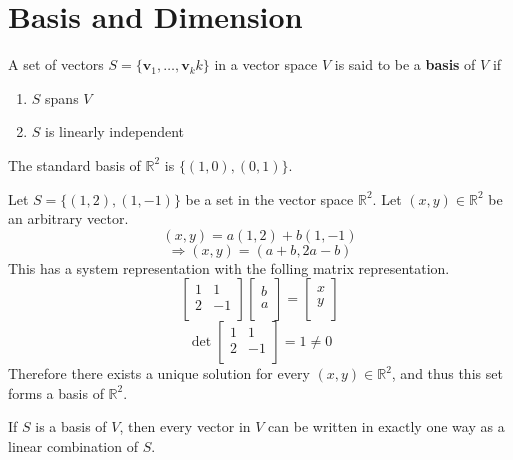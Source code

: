 \section{Basis and Dimension}
\begin{definition}[Basis]
    A set of vectors \(S=\{ \mathbf{v} _1,\ldots,\mathbf{v} _kk \} \) in a vector space \(V\) is said to be a \textbf{basis} of \(V\) if 
    \begin{enumerate}
        \item \(S\) spans \(V\) 
        \item \(S\) is linearly independent
    \end{enumerate}
\end{definition}
\begin{eg}
    The standard basis of \(\mathbb{R} ^2\) is \(\{ (1,0),(0,1) \} \).
\end{eg}
\begin{eg}
    Let \(S=\{ (1,2),(1,-1) \} \) be a set in the vector space \(\mathbb{R} ^2\). Let \((x,y)\in\mathbb{R} ^2\) be an arbitrary vector.
    \[
        (x,y)=a(1,2)+b(1,-1)
    \]
    \[
        \Longrightarrow (x,y)=(a+b,2a-b)
    \]
    This has a system representation with the folling matrix representation.
    \[
        \begin{bmatrix}
            1 &1   \\
             2&-1   \\
        \end{bmatrix} \begin{bmatrix}
             b \\
             a \\
        \end{bmatrix} = \begin{bmatrix}
             x \\
             y \\
        \end{bmatrix}
    \]
    \[
        \det \begin{bmatrix}
            1 &1   \\
             2&-1   \\
        \end{bmatrix}=1\neq 0
    \]
    Therefore there exists a unique solution for every \((x,y)\in\mathbb{R} ^2\), and thus this set forms a basis of \(\mathbb{R} ^2\).
\end{eg}
\begin{theorem}\label{uniqueb}
    If \(S\) is a basis of \(V\), then every vector in \(V\) can be written in exactly one way as a linear combination of \(S\).
\end{theorem}
